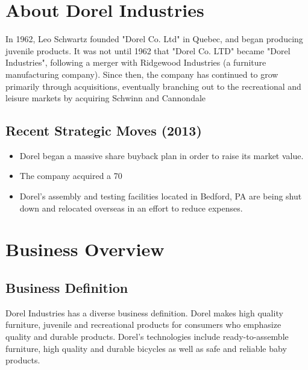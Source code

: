 \chapter{About Dorel Industries}
\label{chp:about}

In 1962, Leo Schwartz founded "Dorel Co. Ltd" in Quebec, and began producing juvenile products.  It was not until 1962 that "Dorel Co. LTD" became "Dorel Industries", following a merger with Ridgewood Industries (a furniture manufacturing company).  Since then, the company has continued to grow primarily through acquisitions, eventually branching out to the recreational and leisure markets by acquiring Schwinn and Cannondale


\section{Recent Strategic Moves (2013)}
\begin{itemize}
  \item Dorel began a massive share buyback plan in order to raise its market value.
  \item The company acquired a 70%
  \item Dorel’s assembly and testing facilities located in Bedford, PA are being shut down and relocated overseas in an effort to reduce expenses.
\end{itemize}


\chapter{Business Overview}
\label{chp:overview}


\section{Business Definition}

Dorel Industries has a diverse business definition.   Dorel makes high quality furniture, juvenile and recreational products for consumers who emphasize quality and durable products.  Dorel’s technologies include ready-to-assemble furniture, high quality and durable bicycles as well as safe and reliable baby products.

